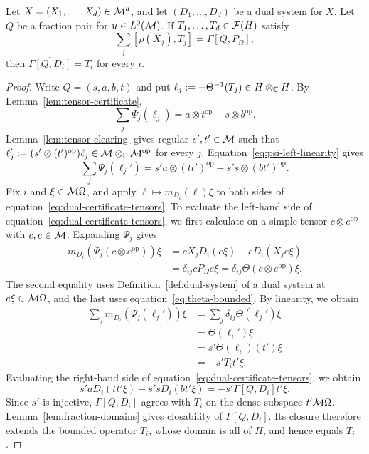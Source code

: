 \begin{lemma}\label{lem:finite-rank-identification}
Let $X=(X_1,\ldots,X_d)\in\mathcal M^d$, and let $(D_1,\ldots,D_d)$ be a dual system for $X$.
Let $Q$ be a fraction pair for $u\in L^0(\mathcal M)$.
If $T_1,\ldots,T_d\in\mathcal F(H)$ satisfy
\[
 \sum_j[\rho(X_j),T_j]=\Gamma[Q,P_\Omega],
\]
then $\overline{\Gamma[Q,D_i]}=T_i$ for every $i$.
\end{lemma}
\begin{proof}
Write $Q=(s,a,b,t)$ and put $\ell_j:=-\Theta^{-1}(T_j)\in H\otimes_{\mathbb C}H$.
By Lemma~\ref{lem:tensor-certificate},
\[
 \sum_j\Psi_j(\ell_j)=a\otimes t^{\mathrm{op}}-s\otimes b^{\mathrm{op}}.
\]
Lemma~\ref{lem:tensor-clearing} gives regular $s',t'\in\mathcal M$ such that
$\ell_j':=(s'\otimes(t')^{\mathrm{op}})\ell_j\in\mathcal M\otimes_{\mathbb C}\mathcal M^{\mathrm{op}}$ for every $j$.
Equation~\eqref{eq:psi-left-linearity} gives
\begin{equation}\label{eq:dual-certificate-tensors}
 \sum_j\Psi_j(\ell_j')
 =s'a\otimes(tt')^{\mathrm{op}}-s's\otimes(bt')^{\mathrm{op}}.
\end{equation}
Fix $i$ and $\xi\in\mathcal M\Omega$, and apply $\ell\mapsto m_{D_i}(\ell)\xi$ to both sides of equation~\eqref{eq:dual-certificate-tensors}.
To evaluate the left-hand side of equation~\eqref{eq:dual-certificate-tensors}, we first calculate on a simple tensor $c\otimes e^{\mathrm{op}}$ with $c,e\in\mathcal M$.
Expanding $\Psi_j$ gives
\[
 \begin{aligned}
 m_{D_i}(\Psi_j(c\otimes e^{\mathrm{op}}))\xi
 &=cX_jD_i(e\xi)-cD_i(X_je\xi)\\
 &=\delta_{ij}cP_\Omega e\xi
  =\delta_{ij}\Theta(c\otimes e^{\mathrm{op}})\xi.
 \end{aligned}
\]
The second equality uses Definition~\ref{def:dual-system} of a dual system at $e\xi\in\mathcal M\Omega$, and the last uses equation~\eqref{eq:theta-bounded}.
By linearity, we obtain
\begin{align*}
 \sum_jm_{D_i}(\Psi_j(\ell_j'))\xi
 &=\sum_j\delta_{ij}\Theta(\ell_j')\xi\\
 &=\Theta(\ell_i')\xi\\
 &=s'\Theta(\ell_i)(t')\xi\\
 &=-s'T_it'\xi.
\end{align*}
Evaluating the right-hand side of equation~\eqref{eq:dual-certificate-tensors}, we obtain
\[
s'aD_i(tt'\xi)-s'sD_i(bt'\xi)=-s'\Gamma[Q,D_i]t'\xi.
\]
Since $s'$ is injective, $\Gamma[Q,D_i]$ agrees with $T_i$ on the dense subspace $t'\mathcal M\Omega$.
Lemma~\ref{lem:fraction-domains} gives closability of $\Gamma[Q,D_i]$.
Its closure therefore extends the bounded operator $T_i$, whose domain is all of $H$, and hence equals $T_i$.
\end{proof}

